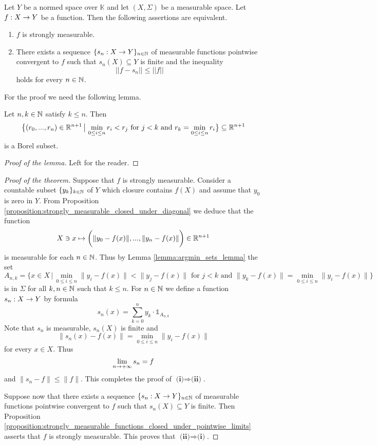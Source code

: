 \begin{theorem}\label{theorem:simple_approximation_strongly_measurable}
    Let $Y$ be a normed space over $\mathbb{K}$ and let $(X,\Sigma)$ be a measurable space. Let $f:X\rightarrow Y$ be a function. Then the following assertions are equivalent.
    \begin{enumerate}[label=\emph{\textbf{(\roman*)}}, leftmargin=*]
        \item $f$ is strongly measurable.
        \item There exists a sequence $\{s_n:X\rightarrow Y\}_{n\in {\mathbb N}}$ of measurable functions pointwise convergent to $f$ such that $s_n(X)\subseteq Y$ is finite and the inequality
              $$||f - s_n||\leq ||f||$$
              holds for every $n\in {\mathbb N}$.
    \end{enumerate}
\end{theorem}
\noindent
For the proof we need the following lemma.

\begin{lemma}\label{lemma:argmin_sets_lemma}
    Let $n,k\in {\mathbb N}$ satisfy $k \leq n$. Then
    $$\big\{(r_0,...,r_n)\in {\mathbb R}^{n+1}\,\big|\,\min_{0\leq i\leq n} r_i < r_j\mbox{ for }j < k\mbox{ and }r_k = \min_{0\leq i\leq n} r_i\big\} \subseteq {\mathbb R}^{n+1}$$
    is a Borel subset.
\end{lemma}
\begin{proof}[Proof of the lemma]
    Left for the reader.
\end{proof}

\begin{proof}[Proof of the theorem]
    Suppose that $f$ is strongly measurable. Consider a countable subset $\{y_k\}_{k\in {\mathbb N}}$ of $Y$ which closure contains $f(X)$ and assume that $y_0$ is zero in $Y$. From Proposition \ref{proposition:strongly_measurable_closed_under_diagonal} we deduce that the function
    $$X\ni x\mapsto \bigg(\lVert y_0 - f(x)\rVert,...,\lVert y_n - f(x)\rVert \bigg)\in {\mathbb R}^{n+1}$$
    is measurable for each $n \in {\mathbb N}$. Thus by Lemma \ref{lemma:argmin_sets_lemma} the set
    $$A_{n,k} = \big\{x \in X\,\big|\,\min_{0\leq i\leq n}\lVert y_i - f(x)\rVert < \lVert y_j - f(x)\rVert \mbox{ for }j < k\mbox{ and }\lVert y_k - f(x)\rVert = \min_{0\leq i\leq n}\lVert y_i - f(x)\rVert\big\}$$
    is in $\Sigma$ for all $k,n\in {\mathbb N}$ such that $k \leq n$. For $n\in {\mathbb N}$ we define a function $s_n:X\rightarrow Y$ by formula
    $$s_n(x) = \sum_{k=0}^ny_k\cdot \mathbb{1}_{A_{n,k}}$$
    Note that $s_n$ is measurable, $s_n(X)$ is finite and
    $$\lVert s_n(x) - f(x)\rVert = \min_{0\leq i\leq n}\lVert y_i - f(x)\rVert$$
    for every $x \in X$. Thus
    $$\lim_{n\rightarrow +\infty}s_n = f$$
    and $\lVert s_n - f\rVert \leq  \lVert f\rVert$. This completes the proof of $\textbf{(i)}\Rightarrow \textbf{(ii)}$.

    Suppose now that there exists a sequence $\{s_n:X\rightarrow Y\}_{n\in {\mathbb N}}$ of measurable functions pointwise convergent to $f$ such that $s_n(X)\subseteq Y$ is finite. Then Proposition \ref{proposition:strongly_measurable_functions_closed_under_pointwise_limits} asserts that $f$ is strongly measurable. This proves that $\textbf{(ii)}\Rightarrow \textbf{(i)}$.
\end{proof}


